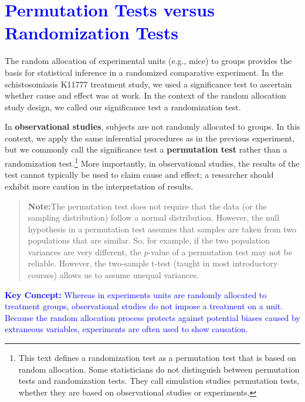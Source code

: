 \documentclass[
]{report}
\begin{document}
\hypertarget{section-5}{%
\section{\texorpdfstring{\textcolor{blue}{Permutation Tests versus Randomization Tests}}{}}\label{section-5}}

The random allocation of experimental units (e.g., mice) to groups provides the basis for statistical inference in a randomized comparative experiment. In the schistosomiasis K11777 treatment study, we used a significance test to ascertain whether cause and effect was at work. In the context of the random allocation study design,
we called our significance test a randomization test.

In \textbf{observational studies}, subjects are not randomly allocated to groups. In this context, we apply the same inferential procedures as in the previous experiment, but we commonly call the significance test a \textbf{permutation test} rather than a randomization test.\footnote{This text defines a randomization test as a permutation test that is based on random allocation. Some statisticians do not distinguish between permutation tests and randomization tests. They call simulation studies permutation tests, whether they are based on observational studies or experiments.} More importantly, in observational studies, the results of the test cannot typically be used to claim cause and effect; a researcher should exhibit more caution in the interpretation of results.

\begin{quote}
\textbf{Note:}The permutation test does not require that the data (or the sampling distribution) follow a normal distribution. However, the null hypothesis in a permutation test assumes that samples are taken from two populations that are similar. So, for example, if the two population variances are very different, the \(\scriptstyle p\)-value of a permutation test may not be reliable. However, the two-sample t-test (taught in most introductory courses) allows us to assume unequal variances.
\end{quote}

\textbf{\textcolor{blue}{Key Concept:}}
\textcolor{blue}{Whereas in experiments units are randomly allocated to treatment groups, observational studies do not impose a treatment on a unit. Because the random allocation process protects against potential biases caused by extraneous variables, experiments are often used to show causation.}
\end{document}
